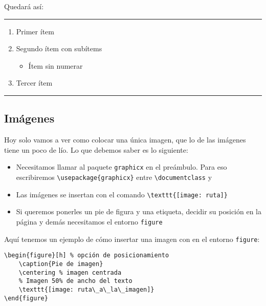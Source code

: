 Quedará así:

\begin{center}\rule{0.5\linewidth}{\linethickness}\end{center}

\begin{enumerate}
\item
  Primer ítem
\item
  Segundo ítem con subítems

  \begin{itemize}
  \item
    Ítem sin numerar
  \end{itemize}
\item
  Tercer ítem
\end{enumerate}

\begin{center}\rule{0.5\linewidth}{\linethickness}\end{center}

\subsection{Imágenes}\label{imuxe1genes}

Hoy solo vamos a ver como colocar una única imagen, que lo de las
imágenes tiene un poco de lío. Lo que debemos saber es lo siguiente:

\begin{itemize}
\item
  Necesitamos llamar al paquete \lstinline!graphicx! en el preámbulo.
  Para eso escribiremos \lstinline!\usepackage{graphicx}! entre
  \lstinline!\documentclass! y \lstinline!!
\item
  Las imágenes se insertan con el comando
  \lstinline!\texttt{[image: ruta]}!
\item
  Si queremos ponerles un pie de figura y una etiqueta, decidir su
  posición en la página y demás necesitamos el entorno
  \lstinline!figure!
\end{itemize}

Aquí tenemos un ejemplo de cómo insertar una imagen con en el entorno
\lstinline!figure!:

\begin{lstlisting}[language={[latex]tex}]
\begin{figure}[h] % opción de posicionamiento
    \caption{Pie de imagen}
    \centering % imagen centrada
    % Imagen 50% de ancho del texto
    \texttt{[image: ruta\_a\_la\_imagen]}
\end{figure}
\end{lstlisting}

